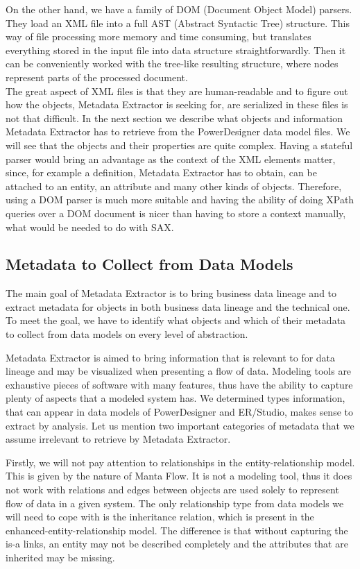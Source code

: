 On the other hand, we have a family of DOM (Document Object Model) parsers. 
They load an XML file into a full AST (Abstract Syntactic Tree) structure. 
This way of file processing more memory and time consuming, but translates everything stored in the input file into data structure straightforwardly. 
Then it can be conveniently worked with the tree-like resulting structure, where nodes represent parts of the processed document. \\

The great aspect of XML files is that they are human-readable and to figure out how the objects, Metadata Extractor is seeking for, are serialized in these files is not that difficult.
In the next section we describe what objects and information Metadata Extractor has to retrieve from the PowerDesigner data model files. We will see that the objects and their properties are quite complex.
Having a stateful parser would bring an advantage as the context of the XML elements matter, since, for example a definition, Metadata Extractor has to obtain, can be attached to an entity, an attribute and many other kinds of objects.
Therefore, using a DOM parser is much more suitable and having the ability of doing XPath queries over a DOM document is nicer than having to store a context manually, what would be needed to do with SAX.

\subsection{Metadata to Collect from Data Models}
\label{metadata_enumeration}

The main goal of Metadata Extractor is to bring business data lineage and to extract metadata for objects in both business data lineage and the technical one.
To meet the goal, we have to identify what objects and which of their metadata to collect from data models on every level of abstraction.

Metadata Extractor is aimed to bring information that is relevant to for data lineage and may be visualized when presenting a flow of data.
Modeling tools are exhaustive pieces of software with many features, thus have the ability to capture plenty of aspects that a modeled system has.
We determined types information, that can appear in data models of PowerDesigner and ER/Studio, makes sense to extract by analysis. Let us mention two important categories of metadata that we assume irrelevant to retrieve by Metadata Extractor.

Firstly, we will not pay attention to relationships in the entity-relationship model. 
This is given by the nature of Manta Flow. It is not a modeling tool, thus it does not work with relations and edges between objects are used solely to represent flow of data in a given system.
The only relationship type from data models we will need to cope with is the inheritance relation, which is present in the enhanced-entity-relationship model. 
The difference is that without capturing the is-a links, an entity may not be described completely and the attributes that are inherited may be missing.

